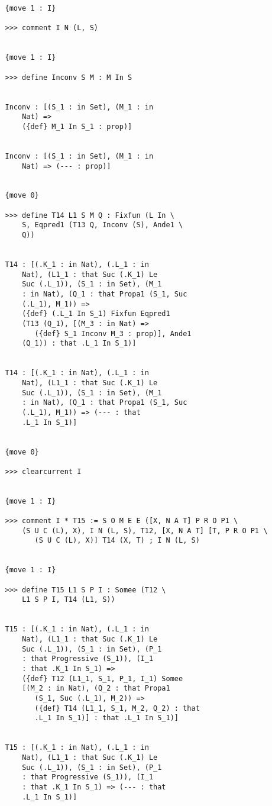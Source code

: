 \documentclass{article}
\begin{document}
\begin{verbatim}
   {move 1 : I}

   >>> comment I N (L, S)


   {move 1 : I}

   >>> define Inconv S M : M In S


   Inconv : [(S_1 : in Set), (M_1 : in 
       Nat) => 
       ({def} M_1 In S_1 : prop)]


   Inconv : [(S_1 : in Set), (M_1 : in 
       Nat) => (--- : prop)]


   {move 0}

   >>> define T14 L1 S M Q : Fixfun (L In \
       S, Eqpred1 (T13 Q, Inconv (S), Ande1 \
       Q))


   T14 : [(.K_1 : in Nat), (.L_1 : in 
       Nat), (L1_1 : that Suc (.K_1) Le 
       Suc (.L_1)), (S_1 : in Set), (M_1 
       : in Nat), (Q_1 : that Propa1 (S_1, Suc 
       (.L_1), M_1)) => 
       ({def} (.L_1 In S_1) Fixfun Eqpred1 
       (T13 (Q_1), [(M_3 : in Nat) => 
          ({def} S_1 Inconv M_3 : prop)], Ande1 
       (Q_1)) : that .L_1 In S_1)]


   T14 : [(.K_1 : in Nat), (.L_1 : in 
       Nat), (L1_1 : that Suc (.K_1) Le 
       Suc (.L_1)), (S_1 : in Set), (M_1 
       : in Nat), (Q_1 : that Propa1 (S_1, Suc 
       (.L_1), M_1)) => (--- : that 
       .L_1 In S_1)]


   {move 0}

   >>> clearcurrent I


   {move 1 : I}

   >>> comment I * T15 := S O M E E ([X, N A T] P R O P1 \
       (S U C (L), X), I N (L, S), T12, [X, N A T] [T, P R O P1 \
          (S U C (L), X)] T14 (X, T) ; I N (L, S)


   {move 1 : I}

   >>> define T15 L1 S P I : Somee (T12 \
       L1 S P I, T14 (L1, S))


   T15 : [(.K_1 : in Nat), (.L_1 : in 
       Nat), (L1_1 : that Suc (.K_1) Le 
       Suc (.L_1)), (S_1 : in Set), (P_1 
       : that Progressive (S_1)), (I_1 
       : that .K_1 In S_1) => 
       ({def} T12 (L1_1, S_1, P_1, I_1) Somee 
       [(M_2 : in Nat), (Q_2 : that Propa1 
          (S_1, Suc (.L_1), M_2)) => 
          ({def} T14 (L1_1, S_1, M_2, Q_2) : that 
          .L_1 In S_1)] : that .L_1 In S_1)]


   T15 : [(.K_1 : in Nat), (.L_1 : in 
       Nat), (L1_1 : that Suc (.K_1) Le 
       Suc (.L_1)), (S_1 : in Set), (P_1 
       : that Progressive (S_1)), (I_1 
       : that .K_1 In S_1) => (--- : that 
       .L_1 In S_1)]



\end{verbatim}
\end{document}
